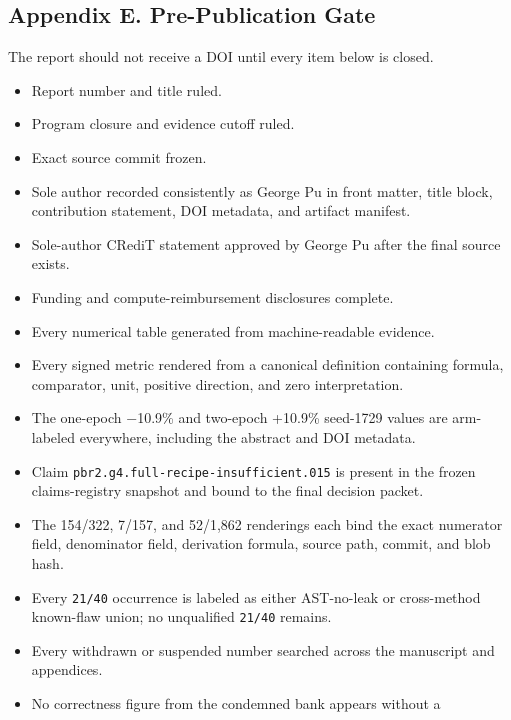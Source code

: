 \documentclass[
  9pt,
  letterpaper,
]{article}
\providecommand{\tightlist}{%
  \setlength{\itemsep}{0pt}\setlength{\parskip}{0pt}}
\begin{document}
\hypertarget{appendix-e-pre-publication-gate}{%
\subsection{Appendix E. Pre-Publication
Gate}\label{appendix-e-pre-publication-gate}}

The report should not receive a DOI until every item below is closed.

\begin{itemize}
\tightlist
\item[$\square$]
  Report number and title ruled.
\item[$\square$]
  Program closure and evidence cutoff ruled.
\item[$\square$]
  Exact source commit frozen.
\item[$\square$]
  Sole author recorded consistently as George Pu in front matter, title
  block, contribution statement, DOI metadata, and artifact manifest.
\item[$\square$]
  Sole-author CRediT statement approved by George Pu after the final
  source exists.
\item[$\square$]
  Funding and compute-reimbursement disclosures complete.
\item[$\square$]
  Every numerical table generated from machine-readable evidence.
\item[$\square$]
  Every signed metric rendered from a canonical definition containing
  formula, comparator, unit, positive direction, and zero
  interpretation.
\item[$\square$]
  The one-epoch −10.9\% and two-epoch +10.9\% seed-1729 values are
  arm-labeled everywhere, including the abstract and DOI metadata.
\item[$\square$]
  Claim \texttt{pbr2.g4.full-recipe-insufficient.015} is present in the
  frozen claims-registry snapshot and bound to the final decision
  packet.
\item[$\square$]
  The 154/322, 7/157, and 52/1,862 renderings each bind the exact
  numerator field, denominator field, derivation formula, source path,
  commit, and blob hash.
\item[$\square$]
  Every \texttt{21/40} occurrence is labeled as either AST-no-leak or
  cross-method known-flaw union; no unqualified \texttt{21/40} remains.
\item[$\square$]
  Every withdrawn or suspended number searched across the manuscript and
  appendices.
\item[$\square$]
  No correctness figure from the condemned bank appears without a

\end{itemize}
\end{document}
